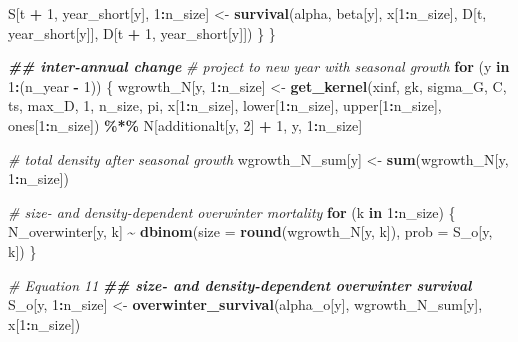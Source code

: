 \documentclass[
]{article}
\newenvironment{Shaded}{\begin{snugshade}}{\end{snugshade}}
\newcommand{\AttributeTok}[1]{\textcolor[rgb]{0.13,0.29,0.53}{#1}}
\newcommand{\CommentTok}[1]{\textcolor[rgb]{0.56,0.35,0.01}{\textit{#1}}}
\newcommand{\ControlFlowTok}[1]{\textcolor[rgb]{0.13,0.29,0.53}{\textbf{#1}}}
\newcommand{\DecValTok}[1]{\textcolor[rgb]{0.00,0.00,0.81}{#1}}
\newcommand{\DocumentationTok}[1]{\textcolor[rgb]{0.56,0.35,0.01}{\textbf{\textit{#1}}}}
\newcommand{\FunctionTok}[1]{\textcolor[rgb]{0.13,0.29,0.53}{\textbf{#1}}}
\newcommand{\NormalTok}[1]{#1}
\newcommand{\OtherTok}[1]{\textcolor[rgb]{0.56,0.35,0.01}{#1}}
\newcommand{\SpecialCharTok}[1]{\textcolor[rgb]{0.81,0.36,0.00}{\textbf{#1}}}
\begin{document}
\begin{Shaded}
\begin{Highlighting}[]
\NormalTok{      S[t }\SpecialCharTok{+} \DecValTok{1}\NormalTok{, year\_short[y], }\DecValTok{1}\SpecialCharTok{:}\NormalTok{n\_size] }\OtherTok{\textless{}{-}} \FunctionTok{survival}\NormalTok{(alpha, beta[y], x[}\DecValTok{1}\SpecialCharTok{:}\NormalTok{n\_size],}
\NormalTok{                                                    D[t, year\_short[y]],}
\NormalTok{                                                    D[t }\SpecialCharTok{+} \DecValTok{1}\NormalTok{, year\_short[y]])}
\NormalTok{    \}}
\NormalTok{  \}}


  \DocumentationTok{\#\# inter{-}annual change}
  \CommentTok{\# project to new year with seasonal growth}
  \ControlFlowTok{for}\NormalTok{ (y }\ControlFlowTok{in} \DecValTok{1}\SpecialCharTok{:}\NormalTok{(n\_year }\SpecialCharTok{{-}} \DecValTok{1}\NormalTok{)) \{}
\NormalTok{    wgrowth\_N[y, }\DecValTok{1}\SpecialCharTok{:}\NormalTok{n\_size] }\OtherTok{\textless{}{-}} \FunctionTok{get\_kernel}\NormalTok{(xinf, gk, sigma\_G, C, ts,}
\NormalTok{                                         max\_D, }\DecValTok{1}\NormalTok{,}
\NormalTok{                                         n\_size, pi, x[}\DecValTok{1}\SpecialCharTok{:}\NormalTok{n\_size],}
\NormalTok{                                         lower[}\DecValTok{1}\SpecialCharTok{:}\NormalTok{n\_size], upper[}\DecValTok{1}\SpecialCharTok{:}\NormalTok{n\_size],}
\NormalTok{                                         ones[}\DecValTok{1}\SpecialCharTok{:}\NormalTok{n\_size]) }\SpecialCharTok{\%*\%}
\NormalTok{      N[additionalt[y, }\DecValTok{2}\NormalTok{] }\SpecialCharTok{+} \DecValTok{1}\NormalTok{, y, }\DecValTok{1}\SpecialCharTok{:}\NormalTok{n\_size]}

    \CommentTok{\# total density after seasonal growth}
\NormalTok{    wgrowth\_N\_sum[y] }\OtherTok{\textless{}{-}} \FunctionTok{sum}\NormalTok{(wgrowth\_N[y, }\DecValTok{1}\SpecialCharTok{:}\NormalTok{n\_size])}

    \CommentTok{\# size{-} and density{-}dependent overwinter mortality}
    \ControlFlowTok{for}\NormalTok{ (k }\ControlFlowTok{in} \DecValTok{1}\SpecialCharTok{:}\NormalTok{n\_size) \{}
\NormalTok{      N\_overwinter[y, k] }\SpecialCharTok{\textasciitilde{}} \FunctionTok{dbinom}\NormalTok{(}\AttributeTok{size =} \FunctionTok{round}\NormalTok{(wgrowth\_N[y, k]),}
                                  \AttributeTok{prob =}\NormalTok{ S\_o[y, k])}
\NormalTok{    \}}

    \CommentTok{\# Equation 11}
    \DocumentationTok{\#\# size{-} and density{-}dependent overwinter survival}
\NormalTok{    S\_o[y, }\DecValTok{1}\SpecialCharTok{:}\NormalTok{n\_size] }\OtherTok{\textless{}{-}} \FunctionTok{overwinter\_survival}\NormalTok{(alpha\_o[y],}
\NormalTok{                                            wgrowth\_N\_sum[y],}
\NormalTok{                                            x[}\DecValTok{1}\SpecialCharTok{:}\NormalTok{n\_size])}


\end{Highlighting}
\end{Shaded}
\end{document}
